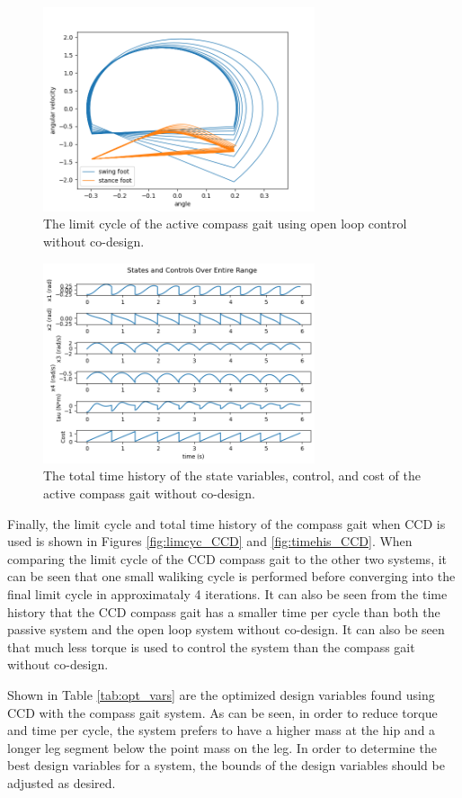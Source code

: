 \documentclass{./springer/svjour3}
\begin{document}
\begin{figure}[h]
\centering
\includegraphics[width=8cm]{./figures/limcycle_nocodesign.png}
\caption{The limit cycle of the active compass gait using open loop control without co-design.}
\label{fig:lim_noco}
\end{figure}

\begin{figure}[h]
\centering
\includegraphics[width=8cm]{./figures/timehis_nocodesign.png}
\caption{The total time history of the state variables, control, and cost of the active compass gait without co-design.}
\label{fig:timehis_noco}
\end{figure}

Finally, the limit cycle and total time history of the compass gait when CCD is used is shown in Figures \ref{fig:limcyc_CCD} and \ref{fig:timehis_CCD}. When comparing the limit 
cycle of the CCD compass gait to the other two systems, it can be seen that one small waliking cycle is performed before converging into the final limit cycle in approximataly 4 
iterations. It can also be seen from the time history that the CCD compass gait has a smaller time per cycle than both the passive system and the open loop system without co-design. 
It can also be seen that much less torque is used to control the system than the compass gait without co-design.

Shown in Table \ref{tab:opt_vars} are the optimized design variables found using CCD with the compass gait system. As can be seen, in order to reduce torque and time per cycle, 
the system prefers to have a higher mass at the hip and a longer leg segment below the point mass on the leg. In order to determine the best design variables for a system, 
the bounds of the design variables should be adjusted as desired.
\end{document}
